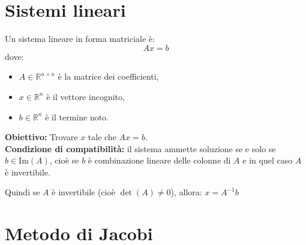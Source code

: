 \documentclass[12pt,a4paper]{article}
\begin{document}
\newpage
\section*{Sistemi lineari}

\begin{flushleft}
\begin{minipage}{\linewidth}
Un sistema lineare in forma matriciale è:
\[
Ax = b
\]
dove:
\begin{itemize}
  \item \( A \in \mathbb{R}^{n \times n} \) è la matrice dei coefficienti,
  \item \( x \in \mathbb{R}^n \) è il vettore incognito,
  \item \( b \in \mathbb{R}^n \) è il termine noto.
\end{itemize}

\textbf{Obiettivo:} Trovare \( x \) tale che \( Ax = b \).\\

\textbf{Condizione di compatibilità:} il sistema ammette soluzione se e solo se \( b \in \text{Im}(A) \), cioè se \( b \) è combinazione lineare delle colonne di \( A \) e in quel caso $A$ è invertibile.

Quindi se \( A \) è invertibile (cioè \( \det(A) \neq 0 \)), allora:
$x = A^{-1}b$
\end{minipage}
\end{flushleft}

\section*{Metodo di Jacobi}

\begin{flushleft}
\end{flushleft}
\end{document}
